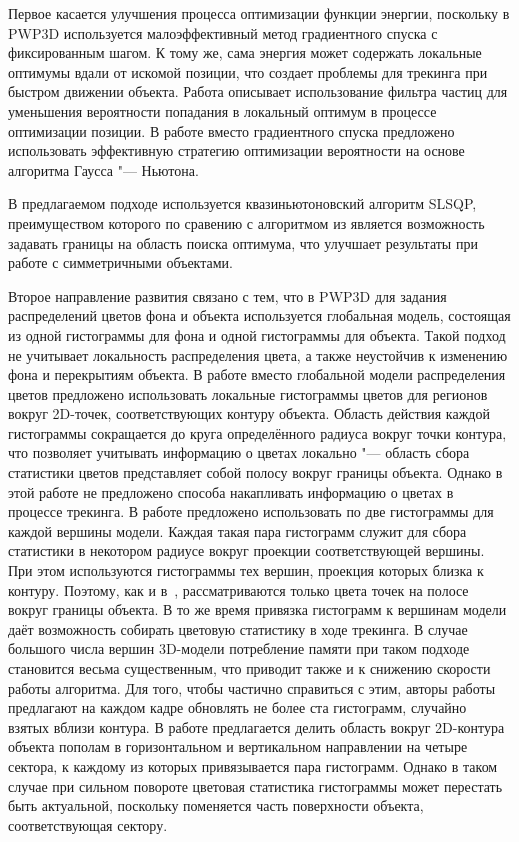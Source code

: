 Первое касается улучшения процесса оптимизации функции энергии, поскольку в
PWP3D используется малоэффективный метод градиентного спуска с фиксированным
шагом.
К тому же, сама энергия может содержать локальные оптимумы вдали от искомой
позиции, что создает проблемы для трекинга при быстром движении объекта.
Работа \cite{Zhao2014} описывает использование фильтра частиц для уменьшения
вероятности попадания в локальный оптимум в процессе оптимизации позиции.
В работе \cite{Tjaden2018} вместо градиентного спуска предложено использовать
эффективную стратегию оптимизации вероятности на основе алгоритма
Гаусса "--- Ньютона.

В предлагаемом подходе используется квазиньютоновский алгоритм SLSQP,
преимуществом которого по сравению с алгоритмом из \cite{Tjaden2018} является
возможность задавать границы на область поиска оптимума, что улучшает
результаты при работе с симметричными объектами.

Второе направление развития связано с тем, что в PWP3D для задания
распределений цветов фона и объекта используется глобальная модель, состоящая
из одной гистограммы для фона и одной гистограммы для объекта.
Такой подход не учитывает локальность распределения цвета, а также неустойчив к
изменению фона и перекрытиям объекта.
В работе \cite{Hexner2016} вместо глобальной модели распределения цветов
предложено использовать локальные гистограммы цветов для регионов вокруг
2D-точек, соответствующих контуру объекта.
Область действия каждой гистограммы сокращается до круга определённого радиуса
вокруг точки контура, что позволяет учитывать информацию о цветах локально "---
область сбора статистики цветов представляет собой полосу вокруг границы
объекта.
Однако в этой работе не предложено способа накапливать информацию о цветах в
процессе трекинга.
В работе \cite{Tjaden2017} предложено использовать по две гистограммы для
каждой вершины модели.
Каждая такая пара гистограмм служит для сбора статистики в некотором радиусе
вокруг проекции соответствующей вершины.
При этом используются гистограммы тех вершин, проекция которых близка к
контуру.
Поэтому, как и в~\cite{Hexner2016}, рассматриваются только цвета точек на
полосе вокруг границы объекта.
В то же время привязка гистограмм к вершинам модели даёт возможность собирать
цветовую статистику в ходе трекинга.
В случае большого числа вершин 3D-модели потребление памяти при таком подходе
становится весьма существенным, что приводит также и к снижению скорости работы
алгоритма.
Для того, чтобы частично справиться с этим, авторы работы \cite{Tjaden2017}
предлагают на каждом кадре обновлять не более ста гистограмм, случайно взятых
вблизи контура.
В работе \cite{Zhong2018} предлагается делить  область вокруг 2D-контура
объекта пополам в горизонтальном и вертикальном направлении на четыре сектора,
к каждому из которых привязывается пара гистограмм.
Однако в таком случае при сильном повороте цветовая статистика гистограммы
может перестать быть актуальной, поскольку поменяется часть поверхности
объекта, соответствующая сектору.

